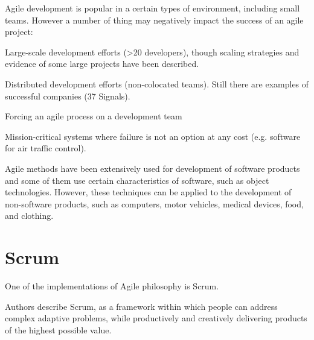 
Agile development is popular in a certain types of environment, including small teams. However a number of thing may negatively impact the success of an agile project:

\begin{compactenum}
\item Large-scale development efforts (>20 developers), though scaling strategies \cite{ambler} and evidence of some large projects \cite{schaaf} have been described.
\item Distributed development efforts (non-colocated teams). Still there are examples of successful companies (37 Signals).
\item Forcing an agile process on a development team
\item Mission-critical systems where failure is not an option at any cost (e.g. software for air traffic control).
\end{compactenum}

Agile methods have been extensively used for development of software products and some of them use certain characteristics of software, such as object technologies. However, these techniques can be applied to the development of non-software products, such as computers, motor vehicles, medical devices, food, and clothing.



\section{Scrum}

One of the implementations of Agile philosophy is Scrum.

Authors describe Scrum, \cite{scrum-guide} as a framework within which people can address complex adaptive problems, while productively and creatively delivering products of the highest possible value.

